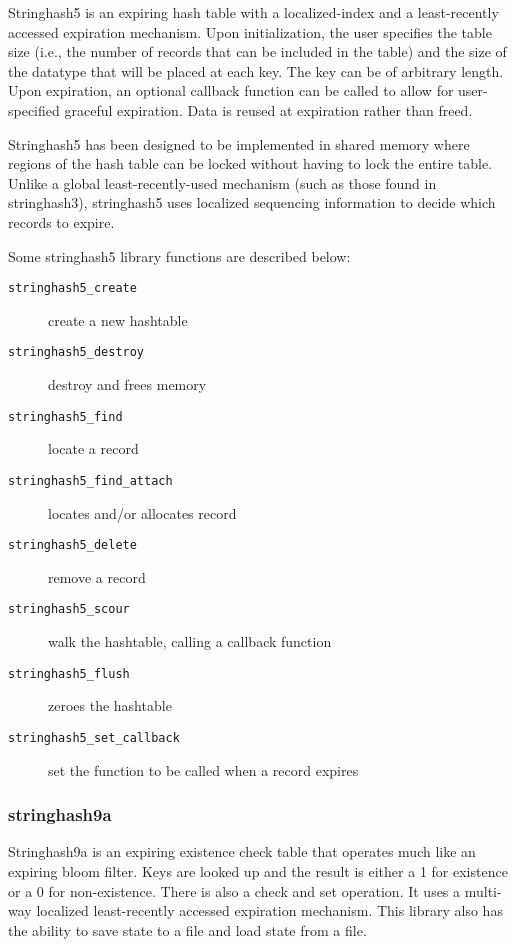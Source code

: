 \documentclass[11pt]{article}
\begin{document}
Stringhash5 is an expiring hash table with a localized-index and a 
least-recently accessed expiration mechanism.  Upon initialization, the user 
specifies the table size (i.e., the number of records that can be included in
the table) and the size of the datatype that will be placed at each key.  
The key can be of arbitrary length.  Upon expiration, an optional callback 
function can be called to allow for user-specified graceful expiration. Data
is reused at expiration rather than freed.  

Stringhash5 has been designed to be implemented in shared memory where regions 
of the hash table can be locked without having to lock the entire table.  
Unlike a global least-recently-used mechanism (such as those found in 
stringhash3), stringhash5 uses localized sequencing information to decide which
records to expire. 

Some stringhash5 library functions are described below: 
\begin{description}
\item[\texttt{stringhash5\_create}] create a new hashtable
\item[\texttt{stringhash5\_destroy}] destroy and frees memory
\item[\texttt{stringhash5\_find}] locate a  record
\item[\texttt{stringhash5\_find\_attach}] locates and/or allocates record
\item[\texttt{stringhash5\_delete}] remove a record
\item[\texttt{stringhash5\_scour}] walk the hashtable, calling a callback function
\item[\texttt{stringhash5\_flush}] zeroes the hashtable
\item[\texttt{stringhash5\_set\_callback}] set the function to be called
when a record expires
\end{description}

\subsubsection{stringhash9a}
Stringhash9a is an expiring existence check table that operates much like an 
expiring bloom filter. Keys are looked up and the result is either a 1 for 
existence or a 0 for non-existence.  There is also a check and set operation.  
It uses a multi-way localized least-recently accessed expiration mechanism.  
This library also has the ability to save state to a file and load state from
a file.
\end{document}
